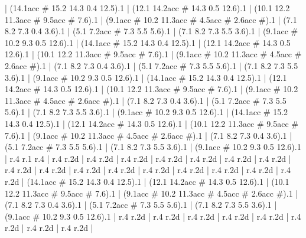     |
      (14.1{acc #} 15.2 14.3 0.4 12.5).1
    |
      (12.1 14.2{acc #} 14.3 0.5 12.6).1
    |
      (10.1 12.2 11.3{acc #} 9.5{acc #} 7.6).1
    |
      (9.1{acc #} 10.2 11.3{acc #} 4.5{acc #} 2.6{acc #}).1
    |
      (7.1 8.2 7.3 0.4 3.6).1
    |
      (5.1 7.2{acc #} 7.3 5.5 5.6).1
    |
      (7.1 8.2 7.3 5.5 3.6).1
    |
      (9.1{acc #} 10.2 9.3 0.5 12.6).1
    |
      (14.1{acc #} 15.2 14.3 0.4 12.5).1
    |
      (12.1 14.2{acc #} 14.3 0.5 12.6).1
    |
      (10.1 12.2 11.3{acc #} 9.5{acc #} 7.6).1
    |
      (9.1{acc #} 10.2 11.3{acc #} 4.5{acc #} 2.6{acc #}).1
    |
      (7.1 8.2 7.3 0.4 3.6).1
    |
      (5.1 7.2{acc #} 7.3 5.5 5.6).1
    |
      (7.1 8.2 7.3 5.5 3.6).1
    |
      (9.1{acc #} 10.2 9.3 0.5 12.6).1
    |
      (14.1{acc #} 15.2 14.3 0.4 12.5).1
    |
      (12.1 14.2{acc #} 14.3 0.5 12.6).1
    |
      (10.1 12.2 11.3{acc #} 9.5{acc #} 7.6).1
    |
      (9.1{acc #} 10.2 11.3{acc #} 4.5{acc #} 2.6{acc #}).1
    |
      (7.1 8.2 7.3 0.4 3.6).1
    |
      (5.1 7.2{acc #} 7.3 5.5 5.6).1
    |
      (7.1 8.2 7.3 5.5 3.6).1
    |
      (9.1{acc #} 10.2 9.3 0.5 12.6).1
    |
      (14.1{acc #} 15.2 14.3 0.4 12.5).1
    |
      (12.1 14.2{acc #} 14.3 0.5 12.6).1
    |
      (10.1 12.2 11.3{acc #} 9.5{acc #} 7.6).1
    |
      (9.1{acc #} 10.2 11.3{acc #} 4.5{acc #} 2.6{acc #}).1
    |
      (7.1 8.2 7.3 0.4 3.6).1
    |
      (5.1 7.2{acc #} 7.3 5.5 5.6).1
    |
      (7.1 8.2 7.3 5.5 3.6).1
    |
      (9.1{acc #} 10.2 9.3 0.5 12.6).1
    |
      r.4
      r.1
      r.4
    |
      r.4
      r.2{d}
    |
      r.4
      r.2{d}
    |
      r.4
      r.2{d}
    |
      r.4
      r.2{d}
    |
      r.4
      r.2{d}
    |
      r.4
      r.2{d}
    |
      r.4
      r.2{d}
    |
      r.4
      r.2{d}
    |
      r.4
      r.2{d}
    |
      r.4
      r.2{d}
    |
      r.4
      r.2{d}
    |
      r.4
      r.2{d}
    |
      r.4
      r.2{d}
    |
      r.4
      r.2{d}
    |
      r.4
      r.2{d}
    |
      r.4
      r.2{d}
    |
      (14.1{acc #} 15.2 14.3 0.4 12.5).1
    |
      (12.1 14.2{acc #} 14.3 0.5 12.6).1
    |
      (10.1 12.2 11.3{acc #} 9.5{acc #} 7.6).1
    |
      (9.1{acc #} 10.2 11.3{acc #} 4.5{acc #} 2.6{acc #}).1
    |
      (7.1 8.2 7.3 0.4 3.6).1
    |
      (5.1 7.2{acc #} 7.3 5.5 5.6).1
    |
      (7.1 8.2 7.3 5.5 3.6).1
    |
      (9.1{acc #} 10.2 9.3 0.5 12.6).1
    |
      r.4
      r.2{d}
    |
      r.4
      r.2{d}
    |
      r.4
      r.2{d}
    |
      r.4
      r.2{d}
    |
      r.4
      r.2{d}
    |
      r.4
      r.2{d}
    |
      r.4
      r.2{d}
    |
      r.4
      r.2{d}
    |
